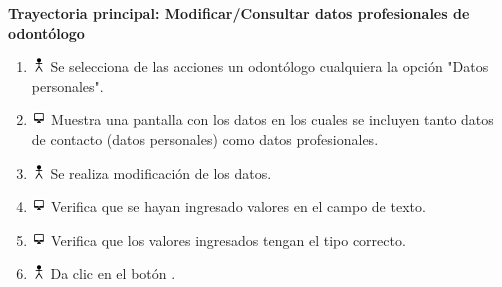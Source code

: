 \textbf{Trayectoria principal: Modificar/Consultar datos profesionales de odontólogo}    
\begin{enumerate}
\item \includegraphics[height=1em]{pictures/actor.png} Se selecciona de las acciones un odontólogo cualquiera la opción "Datos personales".
\item \includegraphics[height=1em]{pictures/sistema.png} Muestra una pantalla con los datos en los cuales se incluyen tanto datos de contacto (datos personales) como datos profesionales.
\item \includegraphics[height=1em]{pictures/actor.png} Se realiza modificación de los datos.
\item \includegraphics[height=1em]{pictures/sistema.png} Verifica que se hayan ingresado valores en el campo de texto.
\item \includegraphics[height=1em]{pictures/sistema.png} Verifica que los valores ingresados tengan el tipo correcto.
\item \includegraphics[height=1em]{pictures/actor.png} Da clic en el botón .
\end{enumerate} \bigskip




